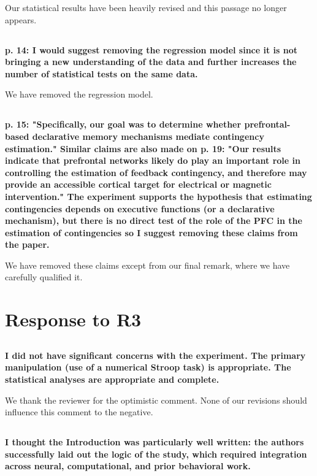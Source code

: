 \documentclass[10pt,a4paper]{article}
\begin{document}
Our statistical results have been heavily revised and this passage no longer
appears.

\subsection{} \textbf{
  p. 14: I would suggest removing the regression model since it is not bringing a
  new understanding of the data and further increases the number of statistical
  tests on the same data.
}

We have removed the regression model.

\subsection{} \textbf{
  p. 15: "Specifically, our goal was to determine whether prefrontal-based
  declarative memory mechanisms mediate contingency estimation." Similar claims
  are also made on p. 19: "Our results indicate that prefrontal networks likely do
  play an important role in controlling the estimation of feedback contingency,
  and therefore may provide an accessible cortical target for electrical or
  magnetic intervention." The experiment supports the hypothesis that estimating
  contingencies depends on executive functions (or a declarative mechanism), but
  there is no direct test of the role of the PFC in the estimation of
  contingencies so I suggest removing these claims from the paper.
}

We have removed these claims except from our final remark, where we have
carefully qualified it.

\section{Response to R3}

\subsection{} \textbf{
  I did not have significant concerns with the experiment. The primary
  manipulation (use of a numerical Stroop task) is appropriate. The statistical
  analyses are appropriate and complete.
}

We thank the reviewer for the optimistic comment. None of our revisions should
influence this comment to the negative.

\subsection{} \textbf{
  I thought the Introduction was particularly well written: the authors
  successfully laid out the logic of the study, which required integration across
  neural, computational, and prior behavioral work.
}
\end{document}
